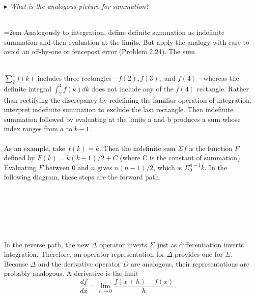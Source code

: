 \documentclass[fleqn]{book}
\begin{document}
\noindent \large $\blacktriangleright$ \textit{What is the analogous picture for summation?}
\\
\\
\noindent
\begin{minipage}[h]{70mm}\parindent=2em
\Large Analogously to integration, define definite summation as indefinite summation and then evaluation at the limits. But apply the analogy with care to avoid an off-by-one or
fencepost error (Problem 2.24). The sum  
\end{minipage} \\ 
$\sum\nolimits_2^4 f(k)$ \Large includes three rectangles—$f(2), f(3),$ and $f(4)$—whereas the definite integral $\int_{2}^{4}f(k)dk$ does not include any of the $f(4)$ rectangle. Rather than rectifying the discrepancy by redefining the familiar operation of integration, interpret indefinite summation to exclude the last rectangle.
Then indefinite summation followed by evaluating at the limits a and b produces a sum whose index ranges from $a$ to $b − 1$.
\\
\\
\Large As an example, take $f(k) = k$. Then the indefinite sum $\Sigma f$ is the function $F$ defined by $F(k) = k(k−1)/2+C$ (where C is the constant of summation). Evaluating $F$ between 0 and $n$ gives $n(n − 1)/2$, which is $\Sigma_0^{n-1}k$. In the following diagram, these steps are the forward path.
\\
\\
\\
\\
\\
\\
\\
In the reverse path, the new $\Delta$ operator inverts $\Sigma$ just as differentiation
inverts integration. Therefore, an operator representation for $\Delta$ provides
one for $\Sigma$. Because $\Delta$ and the derivative operator $D$ are analogous, their
representations are probably analogous. A derivative is the limit\\

\begin{equation}
\frac{df}{dx}=\lim_{h\rightarrow 0}\frac{f(x+h)-f(x)}{h}.
\end{equation}

\newpage
\pagestyle{fancy}


\renewcommand{\headrulewidth}{0pt}
\fancyhf{}

\end{document}
